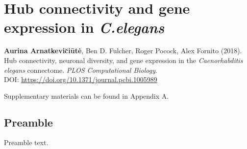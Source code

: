 \chapter{Hub connectivity and gene expression in \textit{C.elegans}}
\label{ch:Chapter2}



\textbf{Aurina Arnatkevi\u{c}i\={u}t\.{e}},
Ben D. Fulcher,
Roger Pocock,
Alex Fornito (2018).
Hub connectivity, neuronal diversity, and gene expression in the \emph{Caenorhabditis elegans} connectome. \textit{PLOS Computational Biology}.\\
DOI: \url{https://doi.org/10.1371/journal.pcbi.1005989} %

Supplementary materials can be found in Appendix A.


\section*{Preamble}
Preamble text.

\newpage

